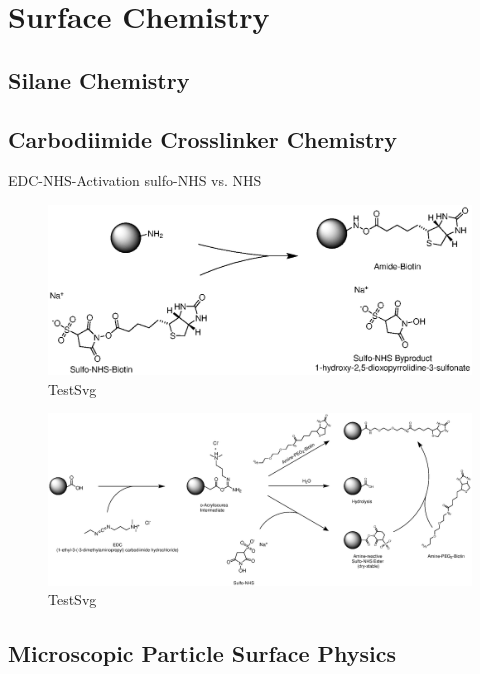 \subsection{}

\section{Surface Chemistry}
\subsection{Silane Chemistry}
\subsection{Carbodiimide Crosslinker Chemistry}
EDC-NHS-Activation
sulfo-NHS vs. NHS
\begin{figure}[hbtp]
\centering
\includegraphics[width=\textwidth]{./Ressources/Chemistry/Sulfo-NHS.eps}
\caption{TestSvg}
\label{fig:Chem:NH2-NHS}
\end{figure}

\begin{figure}[hbtp]
\centering
\includegraphics[width=\textwidth]{./Ressources/Chemistry/EDC-NHS.eps}
\caption{TestSvg}
\label{fig:Chem:COOH-EDC-NHS}
\end{figure}
\subsection{Microscopic Particle Surface Physics}

